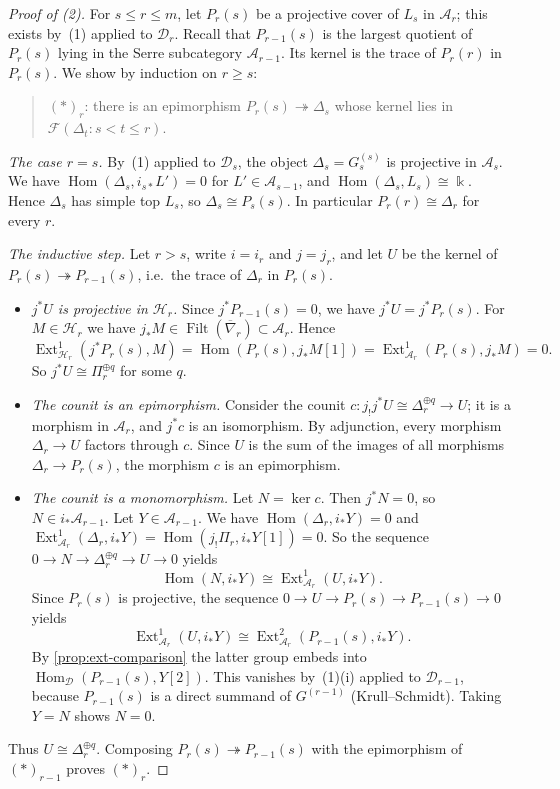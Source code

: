 \documentclass[11pt,reqno]{amsart}
\theoremstyle{plain}
\theoremstyle{definition}
\theoremstyle{remark}
\newcommand{\kk}{\Bbbk}
\DeclareMathOperator{\Hom}{Hom}
\DeclareMathOperator{\Ext}{Ext}
\DeclareMathOperator{\Filt}{Filt}
\newcommand{\nablabar}{\overline{\nabla}}
\newcommand{\cD}{\mathcal{D}}
\newcommand{\cA}{\mathcal{A}}
\newcommand{\cH}{\mathcal{H}}
\newcommand{\cF}{\mathcal{F}}
\begin{document}
\begin{proof}[Proof of \textup{(2)}]
For $s\le r\le m$, let $P_r(s)$ be a projective cover of $L_s$ in $\cA_r$; this exists by~(1) applied to $\cD_r$. Recall that $P_{r-1}(s)$ is the largest quotient of $P_r(s)$ lying in the Serre subcategory $\cA_{r-1}$. Its kernel is the trace of $P_r(r)$ in $P_r(s)$. We show by induction on $r\ge s$:
\begin{quote}
$(\ast)_r$: there is an epimorphism $P_r(s)\twoheadrightarrow\Delta_s$ whose kernel lies in $\cF(\Delta_t: s<t\le r)$.
\end{quote}

\emph{The case $r=s$.} By~(1) applied to $\cD_s$, the object $\Delta_s=G^{(s)}_s$ is projective in $\cA_s$. We have $\Hom(\Delta_s,i_{s*}L')=0$ for $L'\in\cA_{s-1}$, and $\Hom(\Delta_s,L_s)\cong\kk$. Hence $\Delta_s$ has simple top $L_s$, so $\Delta_s\cong P_s(s)$. In particular $P_r(r)\cong\Delta_r$ for every $r$.

\emph{The inductive step.} Let $r>s$, write $i=i_r$ and $j=j_r$, and let $U$ be the kernel of $P_r(s)\twoheadrightarrow P_{r-1}(s)$, i.e.\ the trace of $\Delta_r$ in $P_r(s)$.
\begin{itemize}
\item \emph{$j^*U$ is projective in $\cH_r$.} Since $j^*P_{r-1}(s)=0$, we have $j^*U=j^*P_r(s)$. For $M\in\cH_r$ we have $j_*M\in\Filt(\nablabar_r)\subset\cA_r$. Hence
\[\Ext^1_{\cH_r}(j^*P_r(s),M)=\Hom(P_r(s),j_*M[1])=\Ext^1_{\cA_r}(P_r(s),j_*M)=0.\]
So $j^*U\cong\Pi_r^{\oplus q}$ for some $q$.
\item \emph{The counit is an epimorphism.} Consider the counit $c\colon j_!j^*U\cong\Delta_r^{\oplus q}\to U$; it is a morphism in $\cA_r$, and $j^*c$ is an isomorphism. By adjunction, every morphism $\Delta_r\to U$ factors through $c$. Since $U$ is the sum of the images of all morphisms $\Delta_r\to P_r(s)$, the morphism $c$ is an epimorphism.
\item \emph{The counit is a monomorphism.} Let $N=\ker c$. Then $j^*N=0$, so $N\in i_*\cA_{r-1}$. Let $Y\in\cA_{r-1}$. We have $\Hom(\Delta_r,i_*Y)=0$ and $\Ext^1_{\cA_r}(\Delta_r,i_*Y)=\Hom(j_!\Pi_r,i_*Y[1])=0$. So the sequence $0\to N\to\Delta_r^{\oplus q}\to U\to0$ yields
\[\Hom(N,i_*Y)\cong\Ext^1_{\cA_r}(U,i_*Y).\]
Since $P_r(s)$ is projective, the sequence $0\to U\to P_r(s)\to P_{r-1}(s)\to0$ yields
\[\Ext^1_{\cA_r}(U,i_*Y)\cong\Ext^2_{\cA_r}(P_{r-1}(s),i_*Y).\]
By \cref{prop:ext-comparison} the latter group embeds into $\Hom_\cD(P_{r-1}(s),Y[2])$. This vanishes by~(1)(i) applied to $\cD_{r-1}$, because $P_{r-1}(s)$ is a direct summand of $G^{(r-1)}$ (Krull--Schmidt). Taking $Y=N$ shows $N=0$.
\end{itemize}
Thus $U\cong\Delta_r^{\oplus q}$. Composing $P_r(s)\twoheadrightarrow P_{r-1}(s)$ with the epimorphism of $(\ast)_{r-1}$ proves $(\ast)_r$.


\end{proof}
\end{document}
